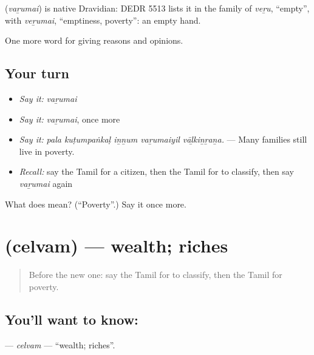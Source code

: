 \begin{cousinweb}
\textbf{} (\emph{vaṟumai}) is native Dravidian: DEDR 5513 lists it in the family of \emph{veṟu}, \textquotedblleft{}empty\textquotedblright{}, with \emph{veṟumai}, \textquotedblleft{}emptiness, poverty\textquotedblright{}: an empty hand.
\end{cousinweb}

\begin{grammarlens}[title={What you've built}]
One more word for giving reasons and opinions.
\end{grammarlens}

\subsection*{Your turn}
\begin{itemize}
\raggedright
  \item \emph{Say it:} \emph{vaṟumai}
  \item \emph{Say it:} \emph{vaṟumai}, once more
  \item \emph{Say it:} \emph{pala kuṭumpaṅkaḷ iṉṉum vaṟumaiyil vāḻkiṉṟaṉa.} — Many families still live in poverty.
  \item \emph{Recall:} say the Tamil for a citizen, then the Tamil for to classify, then say \emph{vaṟumai} again
\end{itemize}

\begin{tcolorbox}[breakable,colback=teal!4,colframe=teal!35!black,title={Before you move on}]
What does  mean? (\textquotedblleft{}Poverty\textquotedblright{}.) Say it once more.
\end{tcolorbox}
\section[\texorpdfstring{\ta{செல்வம்} (celvam)}{செல்வம் (celvam)}]{ (celvam) — wealth; riches}

\label{lesson:TA-C370-celvam}



\begin{quote}
Before the new one: say the Tamil for to classify, then the Tamil for poverty.
\end{quote}

\subsection*{You'll want to know: }
\textbf{} — \emph{celvam} — \textquotedblleft{}wealth; riches\textquotedblright{}.

